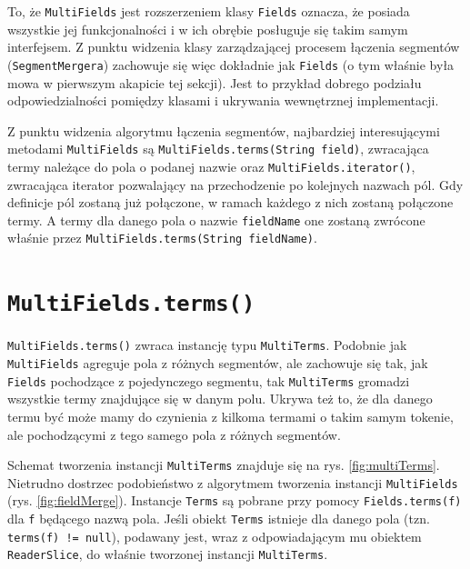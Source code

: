 To, że \texttt{MultiFields} jest rozszerzeniem klasy \texttt{Fields} oznacza, że posiada wszystkie jej funkcjonalności i w ich obrębie posługuje się takim samym interfejsem. Z punktu widzenia klasy zarządzającej procesem łączenia segmentów (\texttt{SegmentMergera}) zachowuje się więc dokładnie jak \texttt{Fields} (o tym właśnie była mowa w pierwszym akapicie tej sekcji). Jest to przykład dobrego podziału odpowiedzialności pomiędzy klasami i ukrywania wewnętrznej implementacji.

Z punktu widzenia algorytmu łączenia segmentów, najbardziej interesującymi metodami \texttt{MultiFields} są \texttt{MultiFields.terms(String field)}, zwracająca termy należące do pola o podanej nazwie oraz \texttt{MultiFields.iterator()}, zwracająca iterator pozwalający na przechodzenie po kolejnych nazwach pól. Gdy definicje pól zostaną już połączone, w ramach każdego z nich zostaną połączone termy. A termy dla danego pola o nazwie \texttt{fieldName} one zostaną zwrócone właśnie przez \texttt{MultiFields.terms(String fieldName)}.

\section{\texttt{MultiFields.terms()}}

\texttt{MultiFields.terms()} zwraca instancję typu \texttt{MultiTerms}. Podobnie jak \texttt{MultiFields} agreguje pola z różnych segmentów, ale zachowuje się tak, jak \texttt{Fields} pochodzące z pojedynczego segmentu, tak \texttt{MultiTerms}  gromadzi wszystkie termy znajdujące się w danym polu. Ukrywa też to, że dla danego termu być może mamy do czynienia z kilkoma termami o takim samym tokenie, ale pochodzącymi z tego samego pola z różnych segmentów.

Schemat tworzenia instancji \texttt{MultiTerms} znajduje się na rys. \ref{fig:multiTerms}. Nietrudno dostrzec podobieństwo z algorytmem tworzenia instancji \texttt{MultiFields} (rys. \ref{fig:fieldMerge}). Instancje \texttt{Terms} są pobrane przy pomocy \texttt{Fields.terms(f)} dla \texttt{f} będącego nazwą pola. Jeśli obiekt \texttt{Terms} istnieje dla danego pola (tzn. \texttt{terms(f) != null}), podawany jest, wraz z odpowiadającym mu obiektem \texttt{ReaderSlice}, do właśnie tworzonej instancji \texttt{MultiTerms}.

